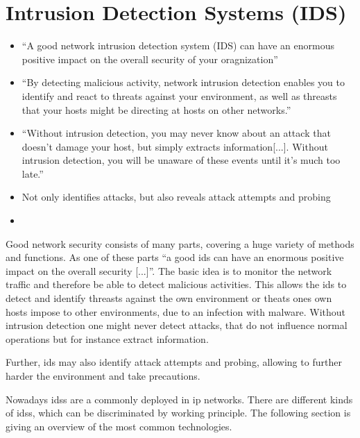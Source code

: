 

\section{Intrusion Detection Systems (IDS)}
\label{sec:background:network:ids}

	\begin{itemize}
		\item \enquote{A good network intrusion detection system (IDS) can have an enormous positive impact on the overall security of your oragnization} \parencite{Northcutt2005}
		\item \enquote{By detecting malicious activity, network intrusion detection enables you to identify and react to threats against your environment, as well as threasts that your hosts might be directing at hosts on other networks.} \parencite[p. 201]{Northcutt2005}
		\item \enquote{Without intrusion detection, you may never know about an attack that doesn't damage your host, but simply extracts information[...]. Without intrusion detection, you will be unaware of these events until it's much too late.} \parencite[p. 202]{Northcutt2005}
		\item Not only identifies attacks, but also reveals attack attempts and probing \parencite[p. 202]{Northcutt2005}
		\item 
	\end{itemize}

Good network security consists of many parts, covering a huge variety of methods and functions. 
As one of these parts \enquote{a good \gls{ids} can have an enormous positive impact on the overall security [...]}. \parencite{Northcutt2005}
The basic idea is to monitor the network traffic and therefore be able to detect malicious activities.
This allows the \gls{ids} to detect and identify threasts against the own environment or theats ones own hosts impose to other environments, due to an infection with malware.
Without intrusion detection one might never detect attacks, that do not influence normal operations but for instance extract information.

Further, \gls{ids} may also identify attack attempts and probing, allowing to further harder the environment and take precautions.

Nowadays \glspl{ids} are a commonly deployed in \gls{ip} networks. There are different kinds of \glspl{ids}, which can be discriminated by working principle. The following section is giving an overview of the most common technologies.

